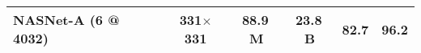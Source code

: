 \documentclass[10pt,twocolumn,letterpaper]{article}
\begin{document}
\begin{table*}[h!]
\begin{tabular}{lc|cc|cc}
\textbf{NASNet-A (6 @ 4032)} & \textbf{331$\times$331} & \textbf{88.9\,M} & \textbf{23.8\,B} & \textbf{82.7} & \textbf{96.2} \\
\bottomrule
\end{tabular}


\end{table*}
\end{document}
